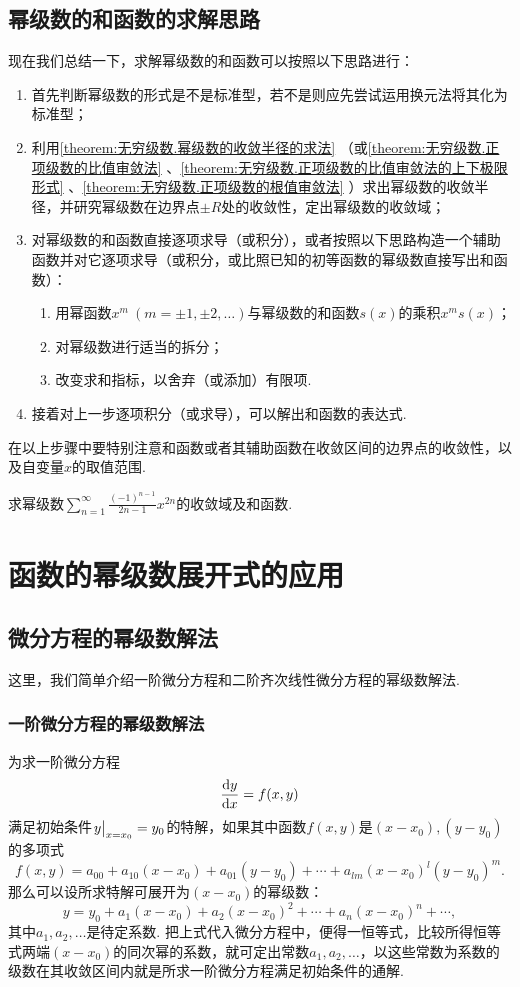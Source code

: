 \subsection{幂级数的和函数的求解思路}
现在我们总结一下，求解幂级数的和函数可以按照以下思路进行：
\begin{enumerate}
\item 首先判断幂级数的形式是不是标准型，若不是则应先尝试运用换元法将其化为标准型；
\item 利用\cref{theorem:无穷级数.幂级数的收敛半径的求法} （或\cref{theorem:无穷级数.正项级数的比值审敛法} 、\cref{theorem:无穷级数.正项级数的比值审敛法的上下极限形式} 、\cref{theorem:无穷级数.正项级数的根值审敛法} ）求出幂级数的收敛半径，并研究幂级数在边界点\(\pm R\)处的收敛性，定出幂级数的收敛域；
\item 对幂级数的和函数直接逐项求导（或积分），或者按照以下思路构造一个辅助函数并对它逐项求导（或积分，或比照已知的初等函数的幂级数直接写出和函数）：
	\begin{enumerate}
	\item 用幂函数\(x^m\ (m=\pm1,\pm2,\dotsc)\)与幂级数的和函数\(s(x)\)的乘积\(x^m s(x)\)；
	\item 对幂级数进行适当的拆分；
	\item 改变求和指标，以舍弃（或添加）有限项.
	\end{enumerate}
\item 接着对上一步逐项积分（或求导），可以解出和函数的表达式.
\end{enumerate}
在以上步骤中要特别注意和函数或者其辅助函数在收敛区间的边界点的收敛性，以及自变量\(x\)的取值范围.

\begin{example}
\def\s{\sum\limits_{n=1}^{\infty}}%
求幂级数\(\s \frac{(-1)^{n-1}}{2n-1} x^{2n}\)的收敛域及和函数.
\end{example}

\section{函数的幂级数展开式的应用}
\subsection{微分方程的幂级数解法}
这里，我们简单介绍一阶微分方程和二阶齐次线性微分方程的幂级数解法.

\subsubsection{一阶微分方程的幂级数解法}
为求一阶微分方程\[
\dv{y}{x} = f(x,y)
\]满足初始条件\(\eval{y}_{x=x_0} = y_0\)的特解，如果其中函数\(f(x,y)\)是\((x-x_0),(y-y_0)\)的多项式\[
f(x,y) = a_{00} + a_{10} (x-x_0) + a_{01} (y-y_0) + \dotsb + a_{lm} (x-x_0)^l (y-y_0)^m.
\]那么可以设所求特解可展开为\((x-x_0)\)的幂级数：\[
y = y_0 + a_1 (x-x_0) + a_2 (x-x_0)^2 + \dotsb + a_n (x-x_0)^n + \dotsb,
\]其中\(a_1,a_2,\dotsc\)是待定系数.
把上式代入微分方程中，便得一恒等式，比较所得恒等式两端\((x-x_0)\)的同次幂的系数，就可定出常数\(a_1,a_2,\dotsc\)，以这些常数为系数的级数在其收敛区间内就是所求一阶微分方程满足初始条件的通解.

